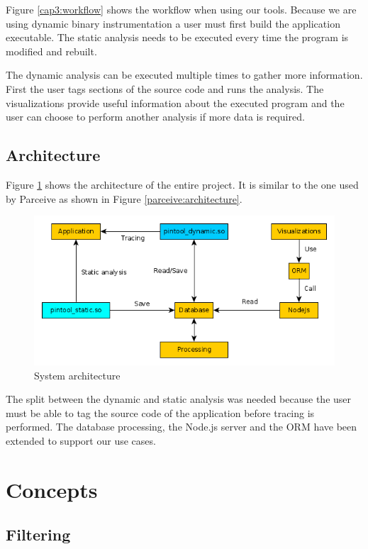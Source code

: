 Figure \ref{cap3:workflow} shows the workflow when using our tools.  Because we are using dynamic binary instrumentation a user must first build the application executable. The static analysis needs to be executed every time the program is modified and rebuilt.

The dynamic analysis can be executed multiple times to gather more information. First the user tags sections of the source code and runs the analysis. The visualizations provide useful information about the executed program and the user can choose to perform another analysis if more data is required.

\subsection{Architecture}

Figure \ref{architecture} shows the architecture of the entire project. It is similar to the one used by Parceive as shown in Figure \ref{parceive:architecture}.

\begin{figure}
	\centering
	\includegraphics[width=1\textwidth]{architecture}
	\caption{System architecture}
	\label{architecture}
\end{figure}

The split between the dynamic and static analysis was needed because the user must be able to tag the source code of the application before tracing is performed. The database processing, the Node.js server and the ORM have been extended to support our use cases.

\section{Concepts}

\subsection{Filtering}

